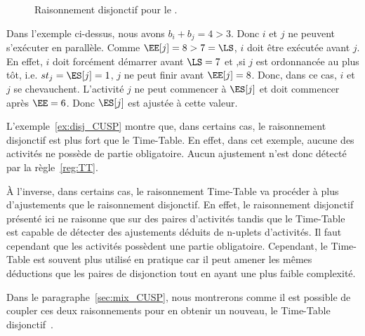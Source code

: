 \begin{ex}
\begin{figure}[htb!]
  \caption{Raisonnement disjonctif pour le \CUSP.}
  \label{fig:disj_CUSP}
\end{figure}
Dans l'exemple ci-dessus, nous avons $b_i+b_j=4 > 3$. Donc $i$ et $j$
ne peuvent s'exécuter en parallèle. Comme $\EE[j] = 8 > 7=\LS$, $i$
doit être exécutée avant $j$. En effet, $i$ doit forcément
démarrer avant $\LS=7$ et ,si $j$ est ordonnancée au plus tôt,
i.e. $st_j=\ES[j]=1$, $j$ ne peut finir avant $\EE[j]=8$. Donc, dans
ce cas, $i$ et $j$ se chevauchent. L'activité $j$ ne peut commencer à
$\ES[j]$ et doit commencer après $\EE=6$. Donc $\ES[j]$ est ajustée à
cette valeur.
\end{ex}

L'exemple~\ref{ex:disj_CUSP} montre que, dans certains cas, le
raisonnement disjonctif est plus fort que le Time-Table. En effet,
dans cet exemple, aucune des activités ne possède de partie
obligatoire. Aucun ajustement n'est donc détecté par la
règle~\ref{reg:TT}. 

{\`A} l'inverse, dans certains cas, le raisonnement Time-Table va
procéder à plus d'ajustements que le raisonnement disjonctif. En
effet, le raisonnement disjonctif présenté ici ne raisonne que sur des
paires d'activités tandis que le Time-Table est capable de détecter
des ajustements déduits de n-uplets d'activités. Il faut cependant que
les activités possèdent une partie obligatoire. Cependant, le
Time-Table est souvent plus utilisé en pratique car il peut amener les
mêmes déductions que les paires de disjonction tout en ayant une plus
faible complexité.

Dans le paragraphe~\ref{sec:mix_CUSP}, nous montrerons comme il est
possible de coupler ces deux raisonnements pour en obtenir un nouveau,
le Time-Table disjonctif~\cite{Gay2015}. 

